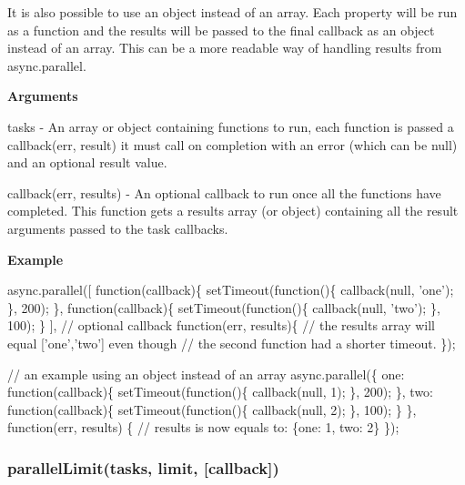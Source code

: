 It is also possible to use an object instead of an array. Each property will be run as a function and the results will be passed to the final callback as an object instead of an array. This can be a more readable way of handling results from async.\+parallel.

{\bfseries Arguments}


\begin{DoxyItemize}
\item tasks -\/ An array or object containing functions to run, each function is passed a callback(err, result) it must call on completion with an error (which can be null) and an optional result value.
\item callback(err, results) -\/ An optional callback to run once all the functions have completed. This function gets a results array (or object) containing all the result arguments passed to the task callbacks.
\end{DoxyItemize}

{\bfseries Example}


\begin{DoxyCode}
async.parallel([
    \textcolor{keyword}{function}(callback)\{
        setTimeout(\textcolor{keyword}{function}()\{
            callback(null, \textcolor{stringliteral}{'one'});
        \}, 200);
    \},
    \textcolor{keyword}{function}(callback)\{
        setTimeout(\textcolor{keyword}{function}()\{
            callback(null, \textcolor{stringliteral}{'two'});
        \}, 100);
    \}
],
\textcolor{comment}{// optional callback}
\textcolor{keyword}{function}(err, results)\{
    \textcolor{comment}{// the results array will equal ['one','two'] even though}
    \textcolor{comment}{// the second function had a shorter timeout.}
\});


\textcolor{comment}{// an example using an object instead of an array}
async.parallel(\{
    one: \textcolor{keyword}{function}(callback)\{
        setTimeout(\textcolor{keyword}{function}()\{
            callback(null, 1);
        \}, 200);
    \},
    two: \textcolor{keyword}{function}(callback)\{
        setTimeout(\textcolor{keyword}{function}()\{
            callback(null, 2);
        \}, 100);
    \}
\},
\textcolor{keyword}{function}(err, results) \{
    \textcolor{comment}{// results is now equals to: \{one: 1, two: 2\}}
\});
\end{DoxyCode}
 



\label{_parallel}%
 \subsubsection*{parallel\+Limit(tasks, limit, \mbox{[}callback\mbox{]})}

